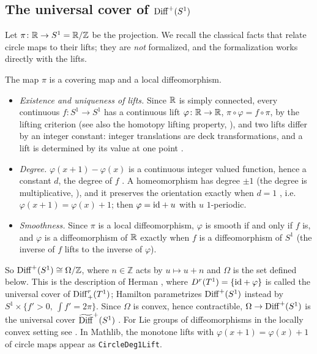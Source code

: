 \subsection{The universal cover of \texorpdfstring{$\operatorname{Diff}^+(S^1)$}{Diff+(S1)}}

Let $\pi \colon \mathbb{R} \to S^1 = \mathbb{R}/\mathbb Z$ be the projection. We recall the classical facts
that relate circle maps to their lifts; they are \emph{not} formalized, and the formalization
works directly with the lifts.

\begin{remark}
  \label{rem:ex-covering}
  The map $\pi$ is a covering map and a local diffeomorphism.
  \begin{itemize}
    \item \emph{Existence and uniqueness of lifts.} Since $\mathbb{R}$ is simply connected, every
    continuous $f \colon S^1 \to S^1$ has a continuous lift $\varphi \colon \mathbb{R} \to \mathbb{R}$,
    $\pi \circ \varphi = f \circ \pi$, by the lifting criterion \cite[\S1.3, Prop.~1.33]{Hat02}
    (see also the homotopy lifting property, \cite[Prop.~1.30]{Hat02}), and two lifts differ by
    an integer constant: integer translations are deck transformations, and a lift is
    determined by its value at one point \cite[Prop.~1.34]{Hat02}.
    \item \emph{Degree.} $\varphi(x + 1) - \varphi(x)$ is a continuous integer valued function,
    hence a constant $d$, the degree of $f$ \cite[Lemma 2.4.3, Def.~2.4.4]{KH95}. A homeomorphism
    has degree $\pm1$ (the degree is multiplicative, \cite[Prop.~8.2.2]{KH95}), and it
    preserves the orientation exactly when $d = 1$ \cite[\S11.1, p.~388]{KH95}, i.e.\ $\varphi(x + 1) = \varphi(x) + 1$;
    then $\varphi = \mathrm{id} + u$ with $u$ $1$-periodic.
    \item \emph{Smoothness.} Since $\pi$ is a local diffeomorphism, $\varphi$ is smooth if and
    only if $f$ is, and $\varphi$ is a diffeomorphism of $\mathbb{R}$ exactly when $f$ is a
    diffeomorphism of $S^1$ (the inverse of $f$ lifts to the inverse of $\varphi$).
  \end{itemize}
  So $\operatorname{Diff}^+(S^1) \cong \Omega/\mathbb Z$, where $n \in \mathbb Z$ acts by $u \mapsto u + n$ and
  $\Omega$ is the set defined below. This is the description of Herman
  \cite[Ch.~I, 1.7]{Her79}, where $D^r(T^1) = \{\mathrm{id} + \varphi\}$ is called the universal cover
  of $\operatorname{Diff}^r_+(T^1)$; Hamilton \cite[Part~I, Example~4.2.6]{Ham82} parametrizes
  $\operatorname{Diff}^+(S^1)$ instead by $S^1 \times \{f' > 0,\ \int f' = 2\pi\}$. Since $\Omega$ is convex,
  hence contractible, $\Omega \to \operatorname{Diff}^+(S^1)$ is the universal cover
  $\widetilde{\operatorname{Diff}}^+(S^1)$ \cite[Introduction (Remarque importante)]{Her79}. For Lie groups
  of diffeomorphisms in the locally convex setting see \cite{GN26}. In Mathlib, the monotone
  lifts with $\varphi(x+1) = \varphi(x) + 1$ of circle maps appear as
  \texttt{CircleDeg1Lift}.
\end{remark}

